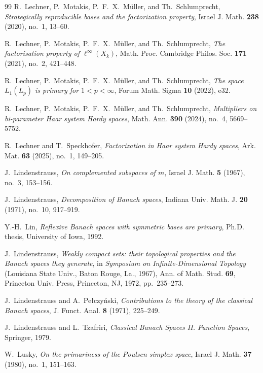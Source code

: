 \documentclass[11pt]{amsart}
\theoremstyle{plain}
\theoremstyle{definition}
\numberwithin{equation}{section}
\begin{document}
\begin{thebibliography}{99}
R.~Lechner, P.~Motakis, P.~F.~X.~M\"uller, and Th.~Schlumprecht,
\emph{Strategically reproducible bases and the factorization property},
Israel J. Math. \textbf{238} (2020), no.~1, 13--60.

R.~Lechner, P.~Motakis, P.~F.~X.~M\"uller, and Th.~Schlumprecht,
\emph{The factorisation property of $\ell^\infty(X_k)$},
Math. Proc. Cambridge Philos. Soc. \textbf{171} (2021), no.~2, 421--448.

R.~Lechner, P.~Motakis, P.~F.~X.~M\"uller, and Th.~Schlumprecht,
\emph{The space $L_1(L_p)$ is primary for $1<p<\infty$},
Forum Math. Sigma \textbf{10} (2022), e32.

R.~Lechner, P.~Motakis, P.~F.~X.~M\"uller, and Th.~Schlumprecht,
\emph{Multipliers on bi-parameter Haar system Hardy spaces},
Math. Ann. \textbf{390} (2024), no.~4, 5669--5752.

R.~Lechner and T.~Speckhofer,
\emph{Factorization in Haar system Hardy spaces},
Ark. Mat. \textbf{63} (2025), no.~1, 149--205.

J.~Lindenstrauss,
\emph{On complemented subspaces of $m$},
Israel J. Math. \textbf{5} (1967), no.~3, 153--156.

J.~Lindenstrauss,
\emph{Decomposition of Banach spaces},
Indiana Univ. Math. J. \textbf{20} (1971), no.~10, 917--919.

Y.-H.~Lin,
\emph{Reflexive Banach spaces with symmetric bases are primary},
Ph.D. thesis, University of Iowa, 1992.

J.~Lindenstrauss,
\emph{Weakly compact sets: their topological properties and the Banach spaces they generate},
in \emph{Symposium on Infinite-Dimensional Topology} (Louisiana State Univ., Baton Rouge, La., 1967),
Ann. of Math. Stud. \textbf{69}, Princeton Univ. Press, Princeton, NJ, 1972, pp.~235--273.

J.~Lindenstrauss and A.~Pe{\l}czy\'nski,
\emph{Contributions to the theory of the classical Banach spaces},
J. Funct. Anal. \textbf{8} (1971), 225--249.

J.~Lindenstrauss and L.~Tzafriri,
\emph{Classical Banach Spaces II. Function Spaces},
Springer, 1979.

W.~Lusky,
\emph{On the primariness of the Poulsen simplex space},
Israel J. Math. \textbf{37} (1980), no.~1, 151--163.


\end{thebibliography}
\end{document}
